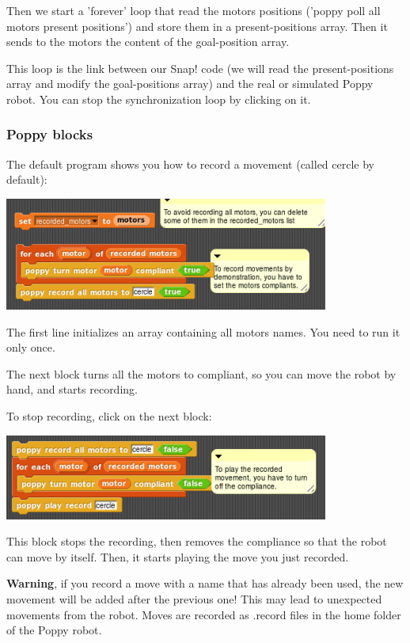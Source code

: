 \documentclass{article}
\begin{document}
Then we start a 'forever' loop that read the motors positions ('poppy poll all motors present positions') and store them in a present-positions array. Then it sends to the motors the content of the goal-position array.

This loop is the link between our Snap! code (we will read the present-positions array and modify the goal-positions array) and the real or simulated Poppy robot. You can stop the synchronization loop by clicking on it.

\subsubsection{Poppy blocks}

The default program shows you how to record a movement (called cercle by default):

 \begin{center}
  \includegraphics[width=0.8\textwidth]{img/snap_record}
 \end{center}
 
 The first line initializes an array containing all motors names. You need to run it only once.
 
 The next block turns all the motors to compliant, so you can move the robot by hand, and starts recording.
 
 To stop recording, click on the next block:
 
 
 \begin{center}
  \includegraphics[width=0.8\textwidth]{img/snap_move}
 \end{center}
 
 This block stops the recording, then removes the compliance so that the robot can move by itself. Then, it starts playing the move you just recorded.
 
 \textbf{Warning}, if you record a move with a name that has already been used, the new movement will be added after the previous one! This may lead to unexpected movements from the robot. Moves are recorded as .record files in the home folder of the Poppy robot.
 
\end{document}
